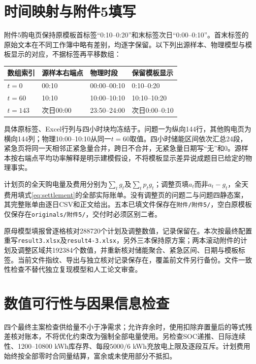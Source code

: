 \section{时间映射与附件5填写}

附件5购电页保持原模板首标签“0:10--0:20”和末标签次日“0:00--0:10”。首末标签的原始文本在不同工作簿中略有差别，均逐字保留。以下列出源样本、物理模型与模板显示的对应，不据标签再平移数组：

\begin{center}\small
\begin{tabular}{llll}\toprule
数组索引 & 源样本右端点 & 物理时段 & 保留模板显示\\\midrule
$t=0$ & 00:10 & 00:00--00:10 & 0:10--0:20\\
$t=60$ & 10:10 & 10:00--10:10 & 10:10--10:20\\
$t=143$ & 次日00:00 & 23:50--24:00 & 次日0:00--0:10\\
\bottomrule\end{tabular}
\end{center}

具体原标签、Excel行列与四小时块均冻结于。问题一为纵向144行，其他购电页为横向144列；物理10:00--10:10从同一$t=60$取值。四小时储能区间依次汇总24段，紧急页将同一天相邻正紧急量合并，跨日不合并，无紧急量日期写“无”和0。源样本按右端点平均功率解释是明示建模假设，不将模板显示差异说成题目已给定的物理事实。

计划页的全天购电量及费用分别为$\sum_tg_t$及$\sum_tp_tg_t$；调整页填$a_t$而非$a_t-g_t$，全天费用填式\eqref{eq:settlement}的全部实际账单。没有调整页的问题二与问题四静态案，其完整账单由逐日CSV和正文给出。五本已填文件保存在\texttt{附件/附件5/}，空白原模板仅保存在\texttt{originals/附件5/}，交付时必须区别二者。

原母模型填报曾逐格核对288720个计划及调整数值，记录保留在。本次按最终配置重写\texttt{result3.xlsx}及\texttt{result4-3.xlsx}，另外三本保持原方案；两本滚动附件的计划及调整区域共192384个数值，并重新核对储能聚合、紧急区间、日期与模板标签。当前文件指纹、导出与独立核对记录保存在，覆盖前文件另行备份。文件一致性检查不替代独立复现模型和人工论文审查。

\section{数值可行性与因果信息检查}

四个最终主案检查供给量不小于净需求；允许弃余时，使用扣除弃置量后的等式残差核对账本，不将优化约束改为强制全部电量使用。另检查SOC递推、日际连续性、1200--10800 kWh库存界、每段$5000/6$ kWh充放电上限及逐段互斥。计划费用始终按全部零时合同量结算，富余或未使用部分不抵扣。

